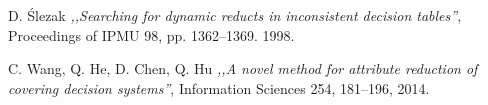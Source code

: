 \begin{thebibliography}{99}
 D. Ślezak \emph{,,Searching for dynamic reducts in inconsistent decision tables''}, Proceedings of IPMU 98, pp. 1362–1369. 1998.

 C. Wang, Q. He, D. Chen, Q. Hu \emph{,,A novel method for attribute reduction of covering decision systems''}, Information Sciences 254, 181–196, 2014.

\end{thebibliography}
\clearpage




